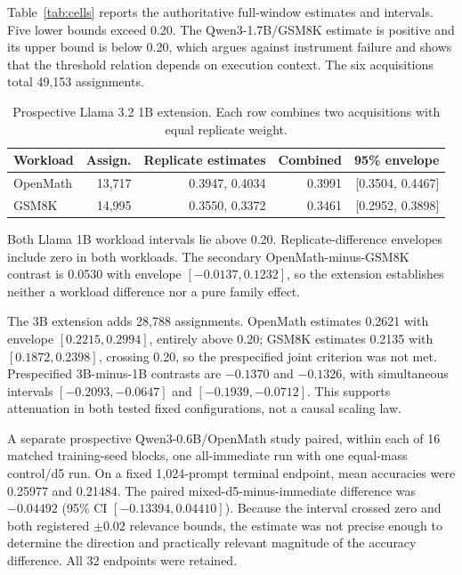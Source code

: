 \documentclass{article}
\begin{document}
Table~\ref{tab:cells} reports the authoritative full-window estimates and intervals. Five lower bounds exceed 0.20. The Qwen3-1.7B/GSM8K estimate is positive and its upper bound is below 0.20, which argues against instrument failure and shows that the threshold relation depends on execution context. The six acquisitions total 49,153 assignments.

\begin{table}[t]
\centering
\caption{Prospective Llama 3.2 1B extension. Each row combines two acquisitions with equal replicate weight.}
\label{tab:llama}
\small
\begin{tabular}{lrrrr}
\toprule
Workload & Assign. & Replicate estimates & Combined & 95\% envelope \\
\midrule
OpenMath & 13,717 & 0.3947, 0.4034 & 0.3991 & [0.3504, 0.4467] \\
GSM8K & 14,995 & 0.3550, 0.3372 & 0.3461 & [0.2952, 0.3898] \\
\bottomrule
\end{tabular}
\end{table}

Both Llama 1B workload intervals lie above 0.20. Replicate-difference envelopes include zero in both workloads. The secondary OpenMath-minus-GSM8K contrast is 0.0530 with envelope $[-0.0137,0.1232]$, so the extension establishes neither a workload difference nor a pure family effect.

The 3B extension adds 28,788 assignments. OpenMath estimates 0.2621 with envelope $[0.2215,0.2994]$, entirely above 0.20; GSM8K estimates 0.2135 with $[0.1872,0.2398]$, crossing 0.20, so the prespecified joint criterion was not met. Prespecified 3B-minus-1B contrasts are $-0.1370$ and $-0.1326$, with simultaneous intervals $[-0.2093,-0.0647]$ and $[-0.1939,-0.0712]$. This supports attenuation in both tested fixed configurations, not a causal scaling law.

A separate prospective Qwen3-0.6B/OpenMath study paired, within each of 16 matched training-seed blocks, one all-immediate run with one equal-mass control/d5 run. On a fixed 1,024-prompt terminal endpoint, mean accuracies were 0.25977 and 0.21484. The paired mixed-d5-minus-immediate difference was $-0.04492$ (95\% CI $[-0.13394,0.04410]$). Because the interval crossed zero and both registered $\pm0.02$ relevance bounds, the estimate was not precise enough to determine the direction and practically relevant magnitude of the accuracy difference. All 32 endpoints were retained.
\end{document}
